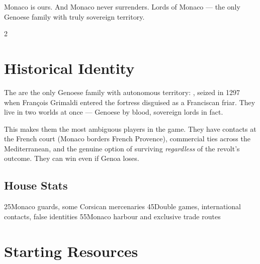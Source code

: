 %
  {Monaco is ours. And Monaco never surrenders.}%
  {Lords of Monaco --- the only Genoese family with truly sovereign territory.}

\begin{multicols}{2}

\section{Historical Identity}

The  are the only Genoese family with autonomous territory:
, seized in 1297 when François Grimaldi entered the fortress
disguised as a Franciscan friar. They live in two worlds at once ---
Genoese by blood, sovereign lords in fact.

This makes them the most ambiguous players in the game. They have contacts
at the French court (Monaco borders French Provence), commercial ties across
the Mediterranean, and the genuine option of surviving \textit{regardless}
of the revolt's outcome. They can win even if Genoa loses.

\columnbreak

\subsection{House Stats}

    {2}{5}{Monaco guards, some Corsican mercenaries}
 {4}{5}{Double games, international contacts, false identities}
 {5}{5}{Monaco harbour and exclusive trade routes}

\end{multicols}

\section{Starting Resources}

